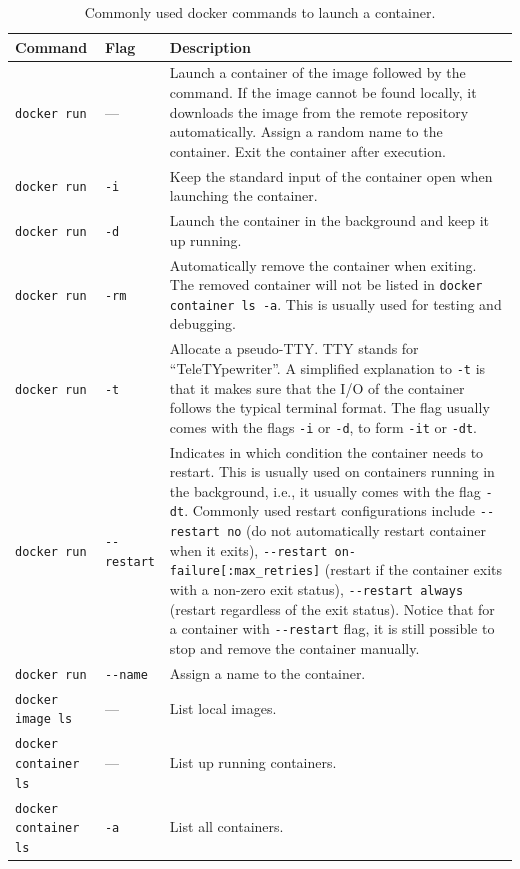 \begin{table}
	\centering \caption{Commonly used docker commands to launch a container.}\label{ch:vac:tab:launchcontainer}
	\begin{tabularx}{\textwidth}{llX}
		\hline
		Command & Flag & Description \\ \hline
		\verb|docker run| & --- & Launch a container of the image followed by the command. If the image cannot be found locally, it downloads the image from the remote repository automatically. Assign a random name to the container. Exit the container after execution. \\ \hdashline
        \verb|docker run| & \verb|-i| & Keep the standard input of the container open when launching the container. \\ \hdashline
        \verb|docker run| & \verb|-d| & Launch the container in the background and keep it up running. \\ \hdashline
        \verb|docker run| & \verb|-rm| & Automatically remove the container when exiting. The removed container will not be listed in \verb|docker container ls -a|. This is usually used for testing and debugging. \\ \hdashline
        \verb|docker run| & \verb|-t| & Allocate a pseudo-TTY. TTY stands for ``TeleTYpewriter''. A simplified explanation to \verb|-t| is that it makes sure that the I/O of the container follows the typical terminal format. The flag usually comes with the flags \verb|-i| or \verb|-d|, to form \verb|-it| or \verb|-dt|. \\ \hdashline
        \verb|docker run| & \verb|--restart| & Indicates in which condition the container needs to restart. This is usually used on containers running in the background, i.e., it usually comes with the flag \verb|-dt|. Commonly used restart configurations include \verb|--restart no| (do not automatically restart container when it exits), \verb|--restart on-failure[:max_retries]| (restart if the container exits with a non-zero exit status), \verb|--restart always| (restart regardless of the exit status). Notice that for a container with \verb|--restart| flag, it is still possible to stop and remove the container manually. \\ \hdashline
        \verb|docker run| & \verb|--name| & Assign a name to the container. \\ \hline
        \verb|docker image ls| & --- & List local images. \\ \hline
        \verb|docker container ls| & --- & List up running containers. \\ \hdashline
        \verb|docker container ls| & \verb|-a| & List all containers. \\
		\hline
	\end{tabularx}
\end{table}

